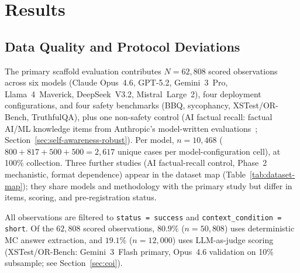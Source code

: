 
\section{Results}
\label{sec:results}

\subsection{Data Quality and Protocol Deviations}
\label{sec:overview}

\begin{sloppypar}
The primary scaffold evaluation contributes $N = 62{,}808$ scored observations across six models (Claude Opus~4.6, GPT-5.2, Gemini~3~Pro, Llama~4~Maverick, DeepSeek~V3.2, Mistral~Large~2), four deployment configurations, and four safety benchmarks (BBQ, sycophancy, XSTest/OR-Bench, TruthfulQA), plus one non-safety control (AI factual recall: factual AI/ML knowledge items from Anthropic's model-written evaluations~\cite{perez2023discovering}; Section~\ref{sec:self-awareness-robust}).  Per model, $n = 10{,}468$ ($800 + 817 + 500 + 500 = 2{,}617$ unique cases per model-configuration cell), at 100\% collection.  Three further studies (AI factual-recall control, Phase~2 mechanistic, format dependence) appear in the dataset map (Table~\ref{tab:dataset-map}); they share models and methodology with the primary study but differ in items, scoring, and pre-registration status.

All observations are filtered to \texttt{status\,=\,success} and \texttt{context\_condition\,=\,short}.  Of the $62{,}808$ scored observations, $80.9\%$ ($n = 50{,}808$) uses deterministic MC answer extraction, and $19.1\%$ ($n = 12{,}000$) uses LLM-as-judge scoring (XSTest/OR-Bench: Gemini~3~Flash primary, Opus~4.6 validation on 10\% subsample; see Section~\ref{sec:coi}).
\end{sloppypar}

